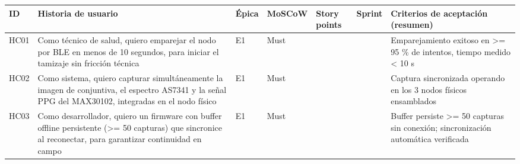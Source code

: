 \documentclass[11pt,a4paper]{article}
\begin{document}
{\small
\begin{longtable}[]{@{}
  >{\raggedright\arraybackslash}p{}
  >{\raggedright\arraybackslash}p{}
  >{\raggedright\arraybackslash}p{}
  >{\raggedright\arraybackslash}p{}
  >{\raggedright\arraybackslash}p{}
  >{\raggedright\arraybackslash}p{}
  >{\raggedright\arraybackslash}p{}@{}}
\toprule\noalign{}
\begin{minipage}[b]{\linewidth}\raggedright
ID
\end{minipage} & \begin{minipage}[b]{\linewidth}\raggedright
Historia de usuario
\end{minipage} & \begin{minipage}[b]{\linewidth}\raggedright
Épica
\end{minipage} & \begin{minipage}[b]{\linewidth}\raggedright
MoSCoW
\end{minipage} & \begin{minipage}[b]{\linewidth}\raggedright
Story points
\end{minipage} & \begin{minipage}[b]{\linewidth}\raggedright
Sprint
\end{minipage} & \begin{minipage}[b]{\linewidth}\raggedright
Criterios de aceptación (resumen)
\end{minipage} \\
\midrule\noalign{}
\endhead
\bottomrule\noalign{}
\endlastfoot
HC01 & Como técnico de salud, quiero emparejar el nodo por BLE en menos de 10 segundos, para iniciar el tamizaje sin fricción técnica & E1 & Must & 5 & 5 & Emparejamiento exitoso en \textgreater= 95 \% de intentos, tiempo medido \textless{} 10 s \\
HC02 & Como sistema, quiero capturar simultáneamente la imagen de conjuntiva, el espectro AS7341 y la señal PPG del MAX30102, integradas en el nodo físico & E1 & Must & 8 & 5 & Captura sincronizada operando en los 3 nodos físicos ensamblados \\
HC03 & Como desarrollador, quiero un firmware con buffer offline persistente (\textgreater= 50 capturas) que sincronice al reconectar, para garantizar continuidad en campo & E1 & Must & 5 & 5 & Buffer persiste \textgreater= 50 capturas sin conexión; sincronización automática verificada \\

\end{longtable}}
\end{document}
